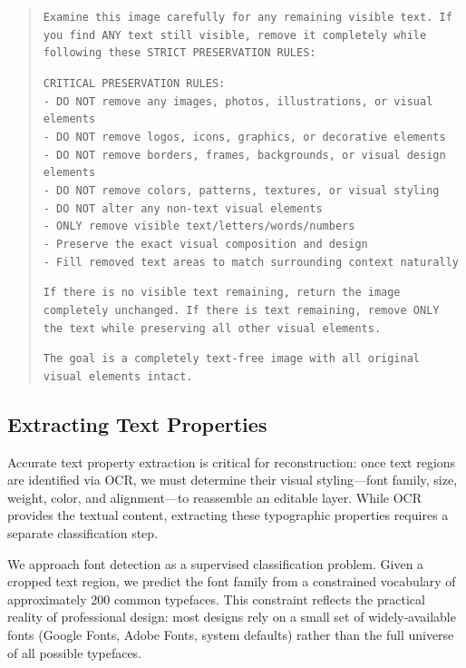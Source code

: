 \documentclass{article}
\begin{document}
\begin{quote}
\small
\texttt{Examine this image carefully for any remaining visible text. If you find ANY text still
visible, remove it completely while following these STRICT PRESERVATION RULES:}

\texttt{CRITICAL PRESERVATION RULES:}\\
\texttt{- DO NOT remove any images, photos, illustrations, or visual elements}\\
\texttt{- DO NOT remove logos, icons, graphics, or decorative elements}\\
\texttt{- DO NOT remove borders, frames, backgrounds, or visual design elements}\\
\texttt{- DO NOT remove colors, patterns, textures, or visual styling}\\
\texttt{- DO NOT alter any non-text visual elements}\\
\texttt{- ONLY remove visible text/letters/words/numbers}\\
\texttt{- Preserve the exact visual composition and design}\\
\texttt{- Fill removed text areas to match surrounding context naturally}

\texttt{If there is no visible text remaining, return the image completely unchanged. If there is
text remaining, remove ONLY the text while preserving all other visual elements.}

\texttt{The goal is a completely text-free image with all original visual elements intact.}
\end{quote}

\subsection{Extracting Text Properties}

Accurate text property extraction is critical for reconstruction: once text regions are identified
via OCR, we must determine their visual styling---font family, size, weight, color, and
alignment---to reassemble an editable layer. While OCR provides the textual content, extracting
these typographic properties requires a separate classification step.

We approach font detection as a supervised classification problem. Given a cropped text region, we
predict the font family from a constrained vocabulary of approximately 200 common typefaces. This
constraint reflects the practical reality of professional design: most designs rely on a small set
of widely-available fonts (Google Fonts, Adobe Fonts, system defaults) rather than the full universe
of all possible typefaces.
\end{document}
